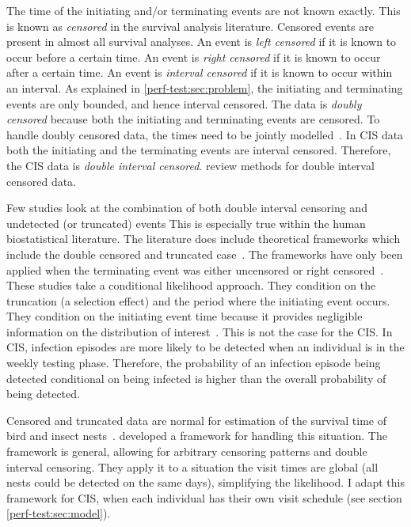 \documentclass[thesis.tex]{subfiles}
\begin{document}
The time of the initiating and/or terminating events are not known exactly.
This is known as \emph{censored} in the survival analysis literature.
Censored events are present in almost all survival analyses.
An event is \emph{left censored} if it is known to occur before a certain time.
An event is \emph{right censored} if it is known to occur after a certain time.
An event is \emph{interval censored} if it is known to occur within an interval.
As explained in \cref{perf-test:sec:problem}, the initiating and terminating events are only bounded, and hence interval censored.
The data is \emph{doubly censored} because both the initiating and terminating events are censored.
To handle doubly censored data, the times need to be jointly modelled~\autocite[and references therein]{liSemiparametric}.
In CIS data both the initiating and the terminating events are interval censored.
Therefore, the CIS data is \emph{double interval censored}.
\Textcite{sunAnalysis,bogaertsSurvival} review methods for double interval censored data.

Few studies look at the combination of both double interval censoring and undetected (or truncated) events
This is especially true within the human biostatistical literature.
The literature does include theoretical frameworks which include the double censored and truncated case~\autocite{turnbullEmpirical,dempsterMaximum}.
The frameworks have only been applied when the terminating event was either uncensored or right censored~\autocite{sunEmpirical,bacchettiNonparametric}.
These studies \autocite[and elsewhere, e.g.:][]{shenNonparametric} take a conditional likelihood approach.
They condition on the truncation (a selection effect) and the period where the initiating event occurs.
They condition on the initiating event time because it provides negligible information on the distribution of interest~.
This is not the case for the CIS.
In CIS, infection episodes are more likely to be detected when an individual is in the weekly testing phase.
Therefore, the probability of an infection episode being detected conditional on being infected is higher than the overall probability of being detected.

Censored and truncated data are normal for estimation of the survival time of bird and insect nests~\autocite{heiseyABCs}.
\textcite{heiseyModelling} developed a framework for handling this situation.
The framework is general, allowing for arbitrary censoring patterns and double interval censoring.
They apply it to a situation the visit times are global (all nests could be detected on the same days), simplifying the likelihood.
I adapt this framework for CIS, when each individual has their own visit schedule (see section \cref{perf-test:sec:model}).
\end{document}
